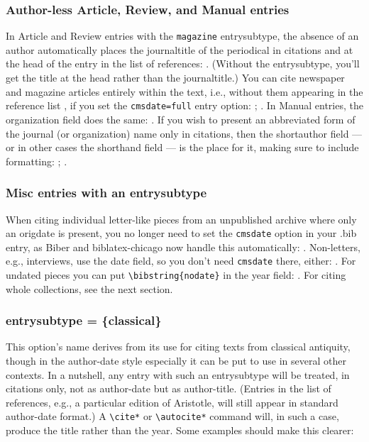 \documentclass[a4paper,12pt]{report}
\newcommand{\cmd}[1]{\texttt{\textbackslash #1}}
\begin{document}
\subsubsection*{Author-less Article, Review, and Manual entries}
\label{sec:authless:art}

In \textsf{Article} and \textsf{Review} entries with the
\texttt{magazine} entrysubtype, the absence of an author automatically
places the \textsf{journaltitle} of the periodical in citations and at
the head of the entry in the list of references:
\autocite{gourmet:052006}.  (Without the entrysubtype, you'll get the
\textsf{title} at the head rather than the \textsf{journaltitle}.)
You can cite newspaper and magazine articles entirely within the text,
i.e., without them appearing in the reference list
\autocite[15.47]{chicago:manual}, if you set the \texttt{cmsdate=full}
entry option: \autocite{lakeforester:pushcarts};
\autocite{nyt:trevorobit}.  In \textsf{Manual} entries, the
\textsf{organization} field does the same: \autocite{dyna:browser}.
If you wish to present an abbreviated form of the journal (or
organization) name only in citations, then the \textsf{shortauthor}
field --- or in other cases the \textsf{shorthand} field --- is the
place for it, making sure to include formatting:
\autocite{unsigned:ranke}; \autocite{bsi:abbreviation}.

\subsubsection*{Misc entries with an entrysubtype}
\label{sec:misc}

When citing individual letter-like pieces from an unpublished archive
where only an \textsf{origdate} is present, you no longer need to set
the \texttt{cmsdate} option in your .bib entry, as \textsf{Biber} and
\textsf{biblatex-chicago} now handle this automatically:
\autocite{creel:house}.  Non-letters, e.g., interviews, use the
\textsf{date} field, so you don't need \texttt{cmsdate} there, either:
\autocite{spock:interview}.  For undated pieces you can put
\cmd{bibstring\{nodate\}} in the \textsf{year} field:
\autocite{dinkel:agassiz}.  For citing whole collections, see the next
section.

\subsubsection*{entrysubtype = \{classical\}}
\label{sec:classical}

This option's name derives from its use for citing texts from
classical antiquity, though in the author-date style especially it can
be put to use in several other contexts.  In a nutshell, any entry
with such an \textsf{entrysubtype} will be treated, in citations only,
not as author-date but as author-title.  (Entries in the list of
references, e.g., a particular edition of Aristotle, will still appear
in standard author-date format.)  A \cmd{cite*} or \cmd{autocite*}
command will, in such a case, produce the title rather than the year.
Some examples should make this clearer:
\end{document}
